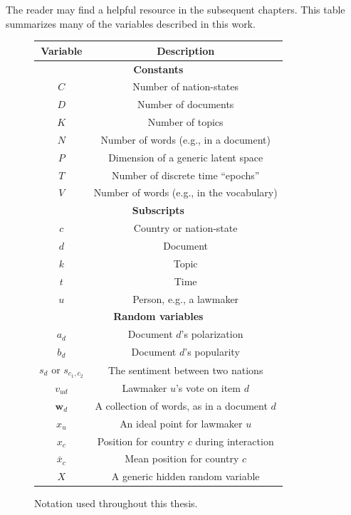 The reader may find  a helpful resource in the
subsequent chapters.  This table summarizes many of the variables
described in this work.
\begin{figure}
  \caption{Notation used throughout this thesis.}
  \begin{center}
    \begin{tabular}{|c|c|}
      \hline
      \textbf{Variable} & \textbf{Description} \\
      \hline
      \multicolumn{2}{|c|}{\textbf{Constants}} \\
      \hline
      $C$ & Number of nation-states \\
      $D$ & Number of documents \\
      $K$ & Number of topics \\
      $N$ & Number of words (e.g., in a document) \\
      $P$ & Dimension of a generic latent space \\
      $T$ & Number of discrete time ``epochs'' \\
      $V$ & Number of words (e.g., in the vocabulary) \\
      \hline
      \multicolumn{2}{|c|}{\textbf{Subscripts}} \\
      \hline
      $c$ & Country or nation-state \\
      $d$ & Document \\
      $k$ & Topic \\
      $t$ & Time \\
      $u$ & Person, e.g., a lawmaker \\
      \hline
      \multicolumn{2}{|c|}{\textbf{Random variables}} \\
      \hline
      $a_d$ & Document $d$'s polarization \\
      $b_d$ & Document $d$'s popularity \\
      $s_d$ or $s_{c_1, c_2}$ & The sentiment between two nations \\
      $v_{ud}$ & Lawmaker $u$'s vote on item $d$ \\
      $\bm w_d$ & A collection of words, as in a document $d$ \\
      $x_u$ & An ideal point for lawmaker $u$ \\
      $x_c$ & Position for country $c$ during interaction \\
      $\bar x_c$ & Mean position for country $c$ \\
      $X$ & A generic hidden random variable \\

\end{tabular}
\end{center}
\end{figure}
